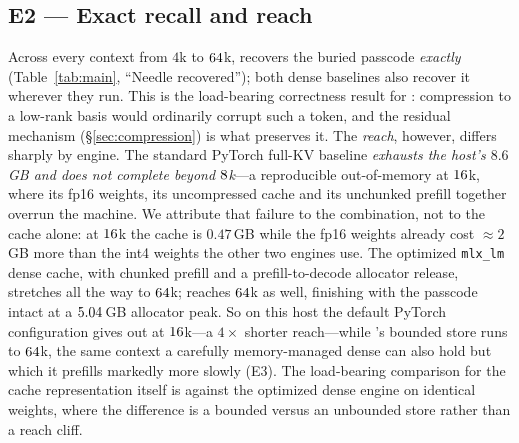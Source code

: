 \subsection{E2 --- Exact recall and reach}
Across every context from $4$k to $64$k, \dkv{} recovers the buried passcode
\emph{exactly} (Table~\ref{tab:main}, ``Needle recovered''); both dense baselines also recover it
wherever they run. This is the load-bearing correctness result for \dkv{}: compression to a
low-rank basis would ordinarily corrupt such a token, and the residual mechanism
(\S\ref{sec:compression}) is what preserves it. The \emph{reach}, however, differs sharply by engine.
The standard PyTorch full-KV baseline \emph{exhausts the host's $8.6$\,GB and does not complete beyond
$8$k}---a reproducible out-of-memory at $16$k, where its fp16 weights, its uncompressed
cache and its unchunked prefill together overrun the machine. We attribute that failure to the
combination, not to the cache alone: at $16$k the cache is $0.47$\,GB while the fp16 weights
already cost ${\approx}2$\,GB more than the int4 weights the other two engines use. The
optimized \texttt{mlx\_lm} dense cache, with chunked prefill and a
prefill-to-decode allocator release, stretches all the way to $64$k; \dkv{} reaches
$64$k as well, finishing with the passcode intact at a $5.04$\,GB allocator peak.
So on this host the default PyTorch configuration gives out at $16$k---a $4\times$ shorter
reach---while \dkv{}'s bounded store runs to $64$k, the same context a carefully
memory-managed dense can also hold but which it prefills markedly more slowly (E3). The
load-bearing comparison for the cache representation itself is \dkv{} against the optimized dense
engine on identical weights, where the difference is a bounded versus an unbounded store rather
than a reach cliff.

